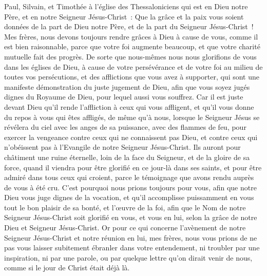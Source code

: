\begin{multicols}{2}
\VerseOne{}Paul, Silvain, et Timothée à l'église des Thessaloniciens qui est en Dieu notre Père, et en notre Seigneur Jésus-Christ~:
Que la grâce et la paix vous soient données de la part de Dieu notre Père, et de la part du Seigneur Jésus-Christ~!
Mes frères, nous devons toujours rendre grâces à Dieu à cause de vous, comme il est bien raisonnable, parce que votre foi augmente beaucoup, et que votre charité mutuelle fait des progrès.
De sorte que nous-mêmes nous nous glorifions de vous dans les églises de Dieu, à cause de votre persévérance et de votre foi au milieu de toutes vos persécutions, et des afflictions que vous avez à supporter,
qui sont une manifeste démonstration du juste jugement de Dieu, afin que vous soyez jugés dignes du Royaume de Dieu, pour lequel aussi vous souffrez.
Car il est juste devant Dieu qu'il rende l'affliction à ceux qui vous affligent,
et qu'il vous donne du repos à vous qui êtes affligés, de même qu'à nous, lorsque le Seigneur Jésus se révélera du ciel avec les anges de sa puissance,
avec des flammes de feu, pour exercer la vengeance contre ceux qui ne connaissent pas Dieu, et contre ceux qui n'obéissent pas à l'Evangile de notre Seigneur Jésus-Christ.
Ils auront pour châtiment une ruine éternelle, loin de la face du Seigneur, et de la gloire de sa force,
quand il viendra pour être glorifié en ce jour-là dans ses saints, et pour être admiré dans tous ceux qui croient, parce le témoignage que avons rendu auprès de vous à été cru.
C'est pourquoi nous prions toujours pour vous, afin que notre Dieu vous juge dignes de la vocation, et qu'il accomplisse puissamment en vous tout le bon plaisir de sa bonté, et l'œuvre de la foi,
afin que le Nom de notre Seigneur Jésus-Christ soit glorifié en vous, et vous en lui, selon la grâce de notre Dieu et Seigneur Jésus-Christ.
\VerseOne{}Or pour ce qui concerne l'avènement de notre Seigneur Jésus-Christ et notre réunion en lui, mes frères, nous vous prions
de ne pas vous laisser subitement ébranler dans votre entendement, ni troubler par une inspiration, ni par une parole, ou par quelque lettre qu'on dirait venir de nous, comme si le jour de Christ était déjà là.

\end{multicols}
